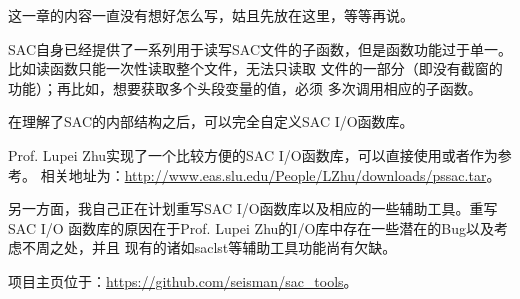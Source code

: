 这一章的内容一直没有想好怎么写，姑且先放在这里，等等再说。

SAC自身已经提供了一系列用于读写SAC文件的子函数，但是函数功能过于单一。
比如读函数只能一次性读取整个文件，无法只读取
文件的一部分（即没有截窗的功能）；再比如，想要获取多个头段变量的值，必须
多次调用相应的子函数。

在理解了SAC的内部结构之后，可以完全自定义SAC I/O函数库。

Prof. Lupei Zhu实现了一个比较方便的SAC I/O函数库，可以直接使用或者作为参考。
相关地址为：\url{http://www.eas.slu.edu/People/LZhu/downloads/pssac.tar}。

另一方面，我自己正在计划重写SAC I/O函数库以及相应的一些辅助工具。重写SAC I/O
函数库的原因在于Prof. Lupei Zhu的I/O库中存在一些潜在的Bug以及考虑不周之处，并且
现有的诸如saclst等辅助工具功能尚有欠缺。

项目主页位于：\url{https://github.com/seisman/sac_tools}。
